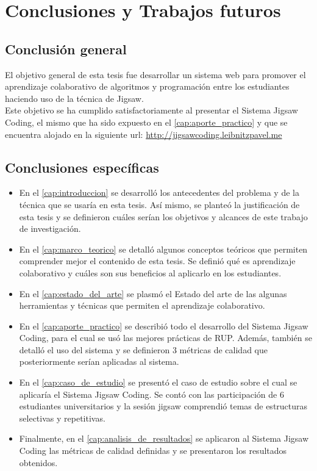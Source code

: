 \chapter{Conclusiones y Trabajos futuros}
\section{Conclusión general}
El objetivo general de esta tesis fue desarrollar un sistema web para promover el aprendizaje colaborativo de algoritmos y programación entre los estudiantes haciendo uso de la técnica de Jigsaw. \\

Este objetivo se ha cumplido satisfactoriamente al presentar el Sistema Jigsaw Coding, el mismo que ha sido expuesto en el \autoref{cap:aporte_practico} y que se encuentra alojado en la siguiente url: \url{http://jigsawcoding.leibnitzpavel.me} 
\section{Conclusiones específicas}
\begin{itemize}
	\item En el \autoref{cap:introduccion} se desarrolló los antecedentes del problema y de la técnica que se usaría en esta tesis. Así mismo, se planteó la justificación de esta tesis y se definieron cuáles serían los objetivos y alcances de este trabajo de investigación.
	\item En el \autoref{cap:marco_teorico} se detalló algunos conceptos teóricos que permiten comprender mejor el contenido de esta tesis. Se definió qué es aprendizaje colaborativo y cuáles son sus beneficios al aplicarlo en los estudiantes.
	\item En el \autoref{cap:estado_del_arte} se plasmó el Estado del arte de las algunas herramientas y técnicas que permiten el aprendizaje colaborativo. 
	\item En el \autoref{cap:aporte_practico} se describió todo el desarrollo del Sistema Jigsaw Coding, para el cual se usó las mejores prácticas de RUP. Además, también se detalló el uso del sistema y se definieron 3 métricas de calidad que posteriormente serían aplicadas al sistema.
	\item En el \autoref{cap:caso_de_estudio} se presentó el caso de estudio sobre el cual se aplicaría el Sistema Jigsaw Coding. Se contó con las participación de 6 estudiantes universitarios y la sesión jigsaw comprendió temas de estructuras selectivas y repetitivas.
	\item Finalmente, en el \autoref{cap:analisis_de_resultados} se aplicaron al Sistema Jigsaw Coding las métricas de calidad definidas y se presentaron los resultados obtenidos.
\end{itemize}

